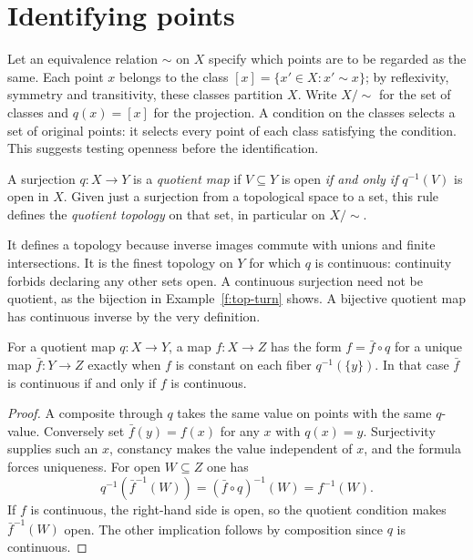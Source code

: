 \section{Identifying points}

Let an equivalence relation $\sim$ on $X$ specify which points are to be regarded as the same. Each point $x$ belongs to the class $[x]=\{x'\in X:x'\sim x\}$; by reflexivity, symmetry and transitivity, these classes partition $X$. Write $X/{\sim}$ for the set of classes and $q(x)=[x]$ for the projection. A condition on the classes selects a set of original points: it selects every point of each class satisfying the condition. This suggests testing openness before the identification.

\begin{definition}\label{f:q-quotient-map}
A surjection $q:X\to Y$ is a \emph{quotient map} if $V\subseteq Y$ is open \emph{if and only if} $q^{-1}(V)$ is open in $X$. Given just a surjection from a topological space to a set, this rule defines the \emph{quotient topology} on that set, in particular on $X/{\sim}$.
\end{definition}

It defines a topology because inverse images commute with unions and finite intersections. It is the finest topology on $Y$ for which $q$ is continuous: continuity forbids declaring any other sets open. A continuous surjection need not be quotient, as the bijection in Example~\ref{f:top-turn} shows. A bijective quotient map has continuous inverse by the very definition.

\begin{theorem}\label{f:q-descent}
For a quotient map $q:X\to Y$, a map $f:X\to Z$ has the form $f=\bar f\circ q$ for a unique map $\bar f:Y\to Z$ exactly when $f$ is constant on each fiber $q^{-1}(\{y\})$. In that case $\bar f$ is continuous if and only if $f$ is continuous.
\end{theorem}
\begin{proof}
A composite through $q$ takes the same value on points with the same $q$-value. Conversely set $\bar f(y)=f(x)$ for any $x$ with $q(x)=y$. Surjectivity supplies such an $x$, constancy makes the value independent of $x$, and the formula forces uniqueness. For open $W\subseteq Z$ one has
\[
 q^{-1}(\bar f^{-1}(W))=(\bar f\circ q)^{-1}(W)=f^{-1}(W).
\]
If $f$ is continuous, the right-hand side is open, so the quotient condition makes $\bar f^{-1}(W)$ open. The other implication follows by composition since $q$ is continuous.
\end{proof}

